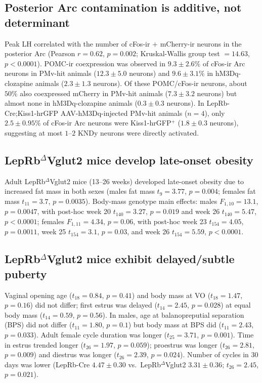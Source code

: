 \documentclass[11pt]{article}
\begin{document}
\subsection{Posterior Arc contamination is additive, not determinant}
Peak LH correlated with the number of cFos-ir $+$ mCherry-ir neurons in the posterior Arc (Pearson $r = 0.62$, $p = 0.002$; Kruskal-Wallis group test $= 14.63$, $p < 0.0001$). POMC-ir coexpression was observed in $9.3 \pm 2.6\%$ of cFos-ir Arc neurons in PMv-hit animals ($12.3 \pm 5.0$ neurons) and $9.6 \pm 3.1\%$ in hM3Dq-clozapine animals ($2.3 \pm 1.3$ neurons). Of these POMC/cFos-ir neurons, about $50\%$ also coexpressed mCherry in PMv-hit animals ($7.3 \pm 3.2$ neurons) but almost none in hM3Dq-clozapine animals ($0.3 \pm 0.3$ neurons). In LepRb-Cre;Kiss1-hrGFP AAV-hM3Dq-injected PMv-hit animals ($n=4$), only $2.5 \pm 0.95\%$ of cFos-ir Arc neurons were Kiss1-hrGFP$^+$ ($1.8 \pm 0.3$ neurons), suggesting at most $1$--$2$ KNDy neurons were directly activated.

\subsection{LepRb$^{\Delta}$Vglut2 mice develop late-onset obesity}
Adult LepRb$^{\Delta}$Vglut2 mice (13--26 weeks) developed late-onset obesity due to increased fat mass in both sexes (males fat mass $t_9 = 3.77$, $p = 0.004$; females fat mass $t_{11} = 3.7$, $p = 0.0035$). Body-mass genotype main effects: males $F_{1,10} = 13.1$, $p = 0.0047$, with post-hoc week 20 $t_{140} = 3.27$, $p = 0.019$ and week 26 $t_{140} = 5.47$, $p < 0.0001$; females $F_{1,11} = 4.34$, $p = 0.06$, with post-hoc week 23 $t_{154} = 4.05$, $p = 0.0011$, week 25 $t_{154} = 3.1$, $p = 0.03$, and week 26 $t_{154} = 5.59$, $p < 0.0001$.

\subsection{LepRb$^{\Delta}$Vglut2 mice exhibit delayed/subtle puberty}
Vaginal opening age ($t_{18} = 0.84$, $p = 0.41$) and body mass at VO ($t_{18} = 1.47$, $p = 0.16$) did not differ; first estrus was delayed ($t_{14} = 2.45$, $p = 0.028$) at equal body mass ($t_{14} = 0.59$, $p = 0.56$). In males, age at balanopreputial separation (BPS) did not differ ($t_{11} = 1.80$, $p = 0.1$) but body mass at BPS did ($t_{11} = 2.43$, $p = 0.033$). Adult female cycle duration was longer ($t_{25} = 3.71$, $p = 0.001$). Time in estrus trended longer ($t_{26} = 1.97$, $p = 0.059$); proestrus was longer ($t_{26} = 2.81$, $p = 0.009$) and diestrus was longer ($t_{26} = 2.39$, $p = 0.024$). Number of cycles in 30 days was lower (LepRb-Cre $4.47 \pm 0.30$ vs.\ LepRb$^{\Delta}$Vglut2 $3.31 \pm 0.36$; $t_{26} = 2.45$, $p = 0.021$).
\end{document}
